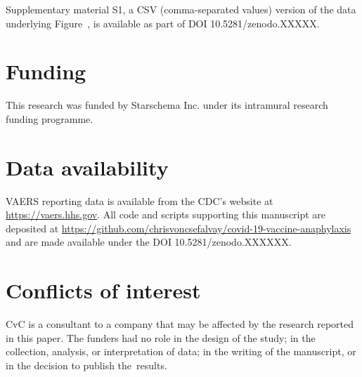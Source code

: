 \documentclass{article}
\begin{document}
Supplementary material S1, a CSV (comma-separated values) version of the data underlying Figure~, is available as part of DOI 10.5281/zenodo.XXXXX.

\section*{Funding}

This research was funded by Starschema Inc. under its intramural research funding programme.

\section*{Data availability}

VAERS reporting data is available from the CDC's website at \url{https://vaers.hhs.gov}.
All code and scripts supporting this manuscript are deposited at
\url{https://github.com/chrisvoncsefalvay/covid-19-vaccine-anaphylaxis} and are made available under the DOI 10.5281/zenodo.XXXXXX.

\section*{Conflicts of interest}

CvC is a consultant to a company that may be affected by the research reported in this paper.
The funders had no role in the design of the study;
in the collection, analysis, or interpretation of data;
in the writing of the manuscript, or in the decision to publish the~results.


\end{document}
